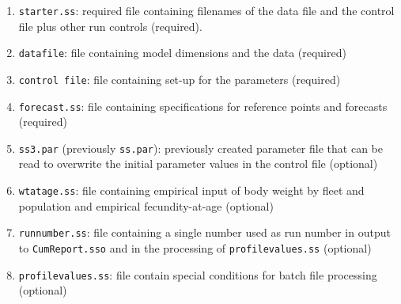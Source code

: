 \begin{enumerate}
	\item \texttt{starter.ss}: required file containing filenames of the data file and the control file plus other run controls (required).
	\item \texttt{datafile}: file containing model dimensions and the data (required)
	\item \texttt{control file}: file containing set-up for the parameters (required)
	\item \texttt{forecast.ss}: file containing specifications for reference points and forecasts (required) 
	\item \texttt{ss3.par} (previously \texttt{ss.par}): previously created parameter file that can be read to overwrite the initial parameter values in the control file (optional)
	\item \texttt{wtatage.ss}: file containing empirical input of body weight by fleet and population and empirical fecundity-at-age (optional)
	\item \texttt{runnumber.ss}: file containing a single number used as run number in output to \texttt{CumReport.sso} and in the processing of \texttt{profilevalues.ss} (optional)
	\item \texttt{profilevalues.ss}: file contain special conditions for batch file processing (optional)
\end{enumerate}
	
\hypertarget{OutputFilesList}{}
